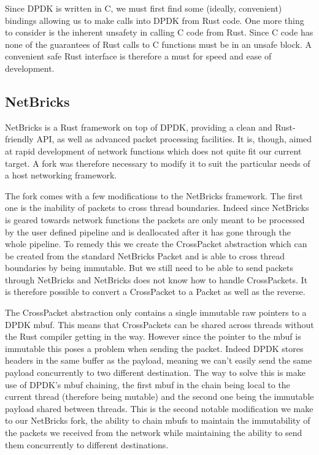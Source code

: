 \documentclass[11pt]{article}
\begin{document}
Since DPDK is written in C, we must first find some (ideally,
convenient) bindings allowing us to make calls into DPDK from Rust
code. One more thing to consider is the inherent unsafety in calling C
code from Rust. Since C code has none of the guarantees of Rust calls
to C functions must be in an unsafe block. A convenient safe Rust
interface is therefore a must for speed and ease of development.

\subsection{NetBricks}
NetBricks is a Rust framework on top of DPDK, providing a clean and
Rust-friendly API, as well as advanced packet processing facilities.
It is, though, aimed at rapid development of network functions which
does not quite fit our current target. A fork was therefore necessary
to modify it to suit the particular needs of a host networking
framework.

The fork comes with a few modifications to the NetBricks
framework. The first one is the inability of packets to cross thread
boundaries. Indeed since NetBricks is geared towards network functions
the packets are only meant to be processed by the user defined
pipeline and is deallocated after it has gone through the whole
pipeline. To remedy this we create the CrossPacket abstraction which
can be created from the standard NetBricks Packet and is able to cross
thread boundaries by being immutable. But we still need to be able to
send packets through NetBricks and NetBricks does not know how to
handle CrossPackets. It is therefore possible to convert a CrossPacket
to a Packet as well as the reverse.

The CrossPacket abstraction only contains a single immutable raw
pointers to a DPDK mbuf. This means that CrossPackets can be shared
across threads without the Rust compiler getting in the way. However
since the pointer to the mbuf is immutable this poses a problem when
sending the packet. Indeed DPDK stores headers in the same buffer as
the payload, meaning we can't easily send the same payload
concurrently to two different destination. The way to solve this is
make use of DPDK's mbuf chaining, the first mbuf in the chain being
local to the current thread (therefore being mutable) and the second
one being the immutable payload shared between threads. This is the
second notable modification we make to our NetBricks fork, the ability
to chain mbufs to maintain the immutability of the packets we received
from the network while maintaining the ability to send them
concurrently to different destinations.
\end{document}
